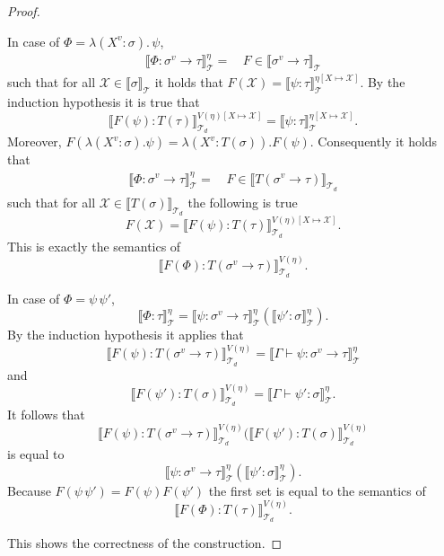 \begin{proof}
\begin{compactitem}
        \item In case of $\Phi = \lambda(X^v \colon \sigma).\,\psi$,
        \begin{align*}
            \llbracket \Phi \colon \sigma^v \rightarrow \tau \rrbracket^\eta_\mathcal{T} =&\,F \in
            \llbracket \sigma^v \rightarrow \tau \rrbracket_\mathcal{T}
        \end{align*}
        such that for all $\mathcal{X} \in \llbracket \sigma \rrbracket_\mathcal{T}$ it holds that $F(\mathcal{X}) =
        \llbracket \psi \colon \tau \rrbracket^{\eta[X \mapsto
        \mathcal{X}]}_\mathcal{T}$.
        By the induction hypothesis it is true that 
        \[\llbracket F(\psi) \colon T
        (\tau) \rrbracket^{V(\eta)[X \mapsto \mathcal{X}]}_{\mathcal{T}_d} = \llbracket \psi \colon \tau \rrbracket^{\eta[X \mapsto \mathcal{X}]}_\mathcal{T}.\]
        Moreover, $F(\lambda(X^v \colon \sigma).\psi) = \lambda(X^v \colon T(\sigma)).F(\psi)$. Consequently it holds that
        \begin{align*}
            \llbracket \Phi \colon \sigma^v \rightarrow \tau \rrbracket^\eta_\mathcal{T} =&\,F \in
            \llbracket T(\sigma^v \rightarrow \tau) \rrbracket_{\mathcal{T}_d}
        \end{align*}
        such that for all $\mathcal{X} \in \llbracket T(\sigma) \rrbracket_{\mathcal{T}_d}$ the following is true \[F(\mathcal{X}) =
        \llbracket F(\psi) \colon T(\tau) \rrbracket^{V(\eta)[X \mapsto
        \mathcal{X}]}_{\mathcal{T}_d}.\]
        This is exactly the semantics of
        \[\llbracket F(\Phi) \colon T(\sigma^v \rightarrow \tau) \rrbracket^{V(\eta)
        }_{\mathcal{T}_d}.\]

        \item In case of $\Phi = \psi\,\psi'$,
        \[\llbracket \Phi \colon \tau \rrbracket^\eta_\mathcal{T} = \llbracket \psi
        \colon \sigma^v \rightarrow \tau \rrbracket^\eta_\mathcal{T}(\llbracket \psi' \colon
        \sigma \rrbracket^\eta_\mathcal{T}).\]
        By the induction hypothesis it applies that \[\llbracket F(\psi) \colon T
        (\sigma^v \rightarrow \tau) \rrbracket^{V(\eta)}_{\mathcal{T}_d} = \llbracket \Gamma
        \vdash \psi \colon \sigma^v \rightarrow \tau \rrbracket^\eta_\mathcal{T}\]
        and
        \[\llbracket F(\psi') \colon T
        (\sigma) \rrbracket^{V(\eta)}_{\mathcal{T}_d} = \llbracket \Gamma
        \vdash \psi' \colon \sigma \rrbracket^\eta_\mathcal{T}.\]
        It follows that
        \[\llbracket F(\psi) \colon T
        (\sigma^v \rightarrow \tau) \rrbracket^{V(\eta)}_{\mathcal{T}_d}(\llbracket F(\psi') \colon T
        (\sigma) \rrbracket^{V(\eta)}_{\mathcal{T}_d}\]
        is equal to
        \[\llbracket \psi
        \colon \sigma^v \rightarrow \tau \rrbracket^\eta_\mathcal{T}(\llbracket \psi' \colon \sigma
        \rrbracket^\eta_\mathcal{T}).\]
        Because $F(\psi\,\psi') = F(\psi)F(\psi')$ the first set is equal to the semantics of
        \[\llbracket F(\Phi) \colon T(\tau) \rrbracket^{V(\eta)}_{\mathcal{T}_d}.\]
    \end{compactitem}
    This shows the correctness of the construction. 
\end{proof}

